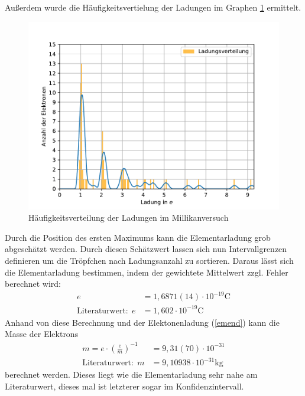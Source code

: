 \documentclass[11pt, a4paper]{article}
\begin{document}
    Außerdem wurde die Häufigkeitsvertielung der Ladungen im Graphen \ref{fig:hauf} ermittelt.

    \begin{figure}[h]
        \centering
        \includegraphics[width=\textwidth]{Ladungsverteilung.pdf}
        \caption{Häufigkeitsverteilung der Ladungen im Millikanversuch}
        \label{fig:hauf}
    \end{figure}
    
    Durch die Position des ersten Maximums kann die Elementarladung grob abgeschätzt werden. Durch diesen Schätzwert lassen sich nun Intervallgrenzen definieren um die Tröpfchen nach Ladungsanzahl zu sortieren.
    Daraus lässt sich die Elementarladung bestimmen, indem der gewichtete Mittelwert zzgl. Fehler berechnet\cite[Kapitel 5]{ABW} wird:
    \begin{align}
        e &= 1,6871\left(14\right) \cdot 10^{-19} \si{\coulomb} \\
        \text{Literaturwert:} \ \ e &= 1,602 \cdot 10^{-19} \si{\coulomb}
    \end{align}
    Anhand von diese Berechnung und der Elektonenladung (\ref{emend}) kann die Masse der Elektrons
    \begin{align}
        m = e \cdot \left(\frac{e}{m}\right)^{-1} &= 9,31(70) \cdot 10^{-31}\\
        \text{Literaturwert:} \ \ m &= 9,10938 \cdot 10^{-31} \si{\kilogram}
    \end{align}
    berechnet werden. Dieses liegt wie die Elementarladung sehr nahe am Literaturwert, dieses mal ist letzterer sogar im Konfidenzintervall.
\end{document}
